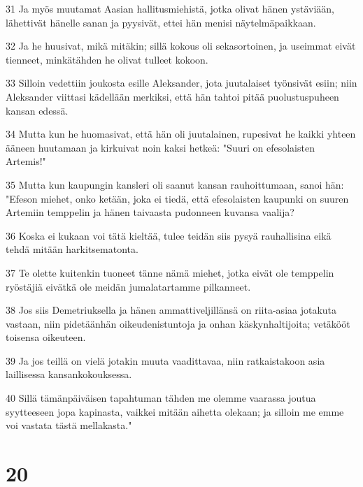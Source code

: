 \par 31 Ja myös muutamat Aasian hallitusmiehistä, jotka olivat hänen ystäviään, lähettivät hänelle sanan ja pyysivät, ettei hän menisi näytelmäpaikkaan.
\par 32 Ja he huusivat, mikä mitäkin; sillä kokous oli sekasortoinen, ja useimmat eivät tienneet, minkätähden he olivat tulleet kokoon.
\par 33 Silloin vedettiin joukosta esille Aleksander, jota juutalaiset työnsivät esiin; niin Aleksander viittasi kädellään merkiksi, että hän tahtoi pitää puolustuspuheen kansan edessä.
\par 34 Mutta kun he huomasivat, että hän oli juutalainen, rupesivat he kaikki yhteen ääneen huutamaan ja kirkuivat noin kaksi hetkeä: "Suuri on efesolaisten Artemis!"
\par 35 Mutta kun kaupungin kansleri oli saanut kansan rauhoittumaan, sanoi hän: "Efeson miehet, onko ketään, joka ei tiedä, että efesolaisten kaupunki on suuren Artemiin temppelin ja hänen taivaasta pudonneen kuvansa vaalija?
\par 36 Koska ei kukaan voi tätä kieltää, tulee teidän siis pysyä rauhallisina eikä tehdä mitään harkitsematonta.
\par 37 Te olette kuitenkin tuoneet tänne nämä miehet, jotka eivät ole temppelin ryöstäjiä eivätkä ole meidän jumalatartamme pilkanneet.
\par 38 Jos siis Demetriuksella ja hänen ammattiveljillänsä on riita-asiaa jotakuta vastaan, niin pidetäänhän oikeudenistuntoja ja onhan käskynhaltijoita; vetäkööt toisensa oikeuteen.
\par 39 Ja jos teillä on vielä jotakin muuta vaadittavaa, niin ratkaistakoon asia laillisessa kansankokouksessa.
\par 40 Sillä tämänpäiväisen tapahtuman tähden me olemme vaarassa joutua syytteeseen jopa kapinasta, vaikkei mitään aihetta olekaan; ja silloin me emme voi vastata tästä mellakasta."

\chapter{20}

